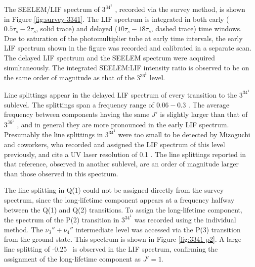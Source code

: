 \documentclass[12pt]{mitthesis}
\begin{document}
































The SEELEM/LIF spectrum of $3^34^1$ , recorded via the survey
method, is shown in Figure \ref{fig:survey-3341}.  The LIF spectrum is
integrated in both early ($0.5\tau_s-2\tau_s$, solid trace) and
delayed ($10\tau_s-18\tau_s$, dashed trace) time windows.  Due to
saturation of the photomultiplier tube at early time intervals, the
early LIF spectrum shown in the figure was recorded and calibrated in
a separate scan.  The delayed LIF spectrum and the SEELEM spectrum
were acquired simultaneously.  The integrated SEELEM:LIF intensity
ratio is observed to be on the same order of magnitude as that of the
$3^36^1$  level.

Line splittings appear in the delayed LIF spectrum of every transition
to the $3^34^1$  sublevel.  The splittings span a frequency
range of $0.06-0.3$ \rcm.  The average frequency between components
having the same $J'$ is slightly larger than that of $3^36^1$ ,
and in general they are more pronounced in the early LIF spectrum.
Presumably the line splittings in $3^34^1$  were too small to be
detected by Mizoguchi and coworkers, who recorded and assigned the LIF
spectrum of this level previously, and cite a UV laser resolution of
0.1 \rcm \cite{mizoguchi00}.  The line splittings reported in that
reference, observed in another sublevel, are an order of magnitude
larger than those observed in this spectrum.

The line splitting in Q(1) could not be assigned directly from the
survey spectrum, since the long-lifetime component appears at a
frequency halfway between the Q(1) and Q(2) transitions.  To assign
the long-lifetime component, the spectrum of the P(2) transition in
$3^34^1$  was recorded using the individual method.  The
$\nu_3''+\nu_4''$ intermediate level was accessed via the P(3)
transition from the ground state.  This spectrum is shown in Figure
\ref{fig:3341-p2}.  A large line splitting of -0.25 \rcm\ is observed
in the LIF spectrum, confirming the assignment of the long-lifetime
component as $J'=1$.
\end{document}

